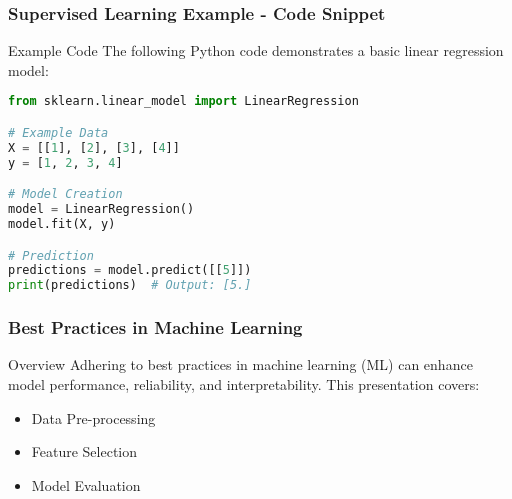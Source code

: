 \documentclass[aspectratio=169]{beamer}
\begin{document}
\begin{frame}[fragile]
    \frametitle{Supervised Learning Example - Code Snippet}
    \begin{block}{Example Code}
    The following Python code demonstrates a basic linear regression model:
    \begin{lstlisting}[language=Python]
from sklearn.linear_model import LinearRegression

# Example Data
X = [[1], [2], [3], [4]]
y = [1, 2, 3, 4]

# Model Creation
model = LinearRegression()
model.fit(X, y)

# Prediction
predictions = model.predict([[5]])
print(predictions)  # Output: [5.]
    \end{lstlisting}
    \end{block}
\end{frame}

\begin{frame}[fragile]
    \frametitle{Best Practices in Machine Learning}
    \begin{block}{Overview}
        Adhering to best practices in machine learning (ML) can enhance model performance, reliability, and interpretability.
        This presentation covers:
        \begin{itemize}
            \item Data Pre-processing
            \item Feature Selection
            \item Model Evaluation
        \end{itemize}
    \end{block}
\end{frame}
\end{document}
